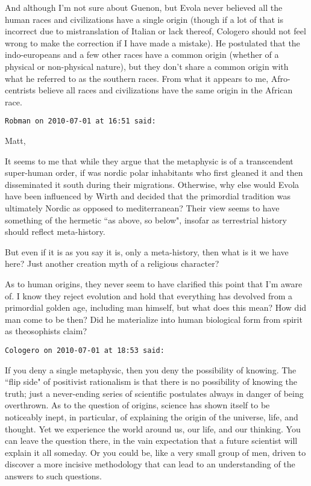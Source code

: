 \begin{footnotesize}
\begin{sffamily}
And although I'm not sure about Guenon, but Evola never believed all the human races and civilizations have a single origin (though if a lot of that is incorrect due to mistranslation of Italian or lack thereof, Cologero should not feel wrong to make the correction if I have made a mistake). He postulated that the indo-europeans and a few other races have a common origin (whether of a physical or non-physical nature), but they don't share a common origin with what he referred to as the southern races. From what it appears to me, Afro-centrists believe all races and civilizations have the same origin in the African race.


\hfill

\texttt{Robman on 2010-07-01 at 16:51 said: }

Matt, 

It seems to me that while they argue that the metaphysic is of a transcendent super-human order, if was nordic polar inhabitants who first gleaned it and then disseminated it south during their migrations. Otherwise, why else would Evola have been influenced by Wirth and decided that the primordial tradition was ultimately Nordic as opposed to mediterranean? Their view seems to have something of the hermetic ``as above, so below", insofar as terrestrial history should reflect meta-history.

But even if it is as you say it is, only a meta-history, then what is it we have here? Just another creation myth of a religious character?

As to human origins, they never seem to have clarified this point that I'm aware of. I know they reject evolution and hold that everything has devolved from a primordial golden age, including man himself, but what does this mean? How did man come to be then? Did he materialize into human biological form from spirit as theosophists claim?


\hfill

\texttt{Cologero on 2010-07-01 at 18:53 said: }

If you deny a single metaphysic, then you deny the possibility of knowing. The ``flip side" of positivist rationalism is that there is no possibility of knowing the truth; just a never-ending series of scientific postulates always in danger of being overthrown. As to the question of origins, science has shown itself to be noticeably inept, in particular, of explaining the origin of the universe, life, and thought. Yet we experience the world around us, our life, and our thinking. You can leave the question there, in the vain expectation that a future scientist will explain it all someday. Or you could be, like a very small group of men, driven to discover a more incisive methodology that can lead to an understanding of the answers to such questions.


\end{sffamily}
\end{footnotesize}
